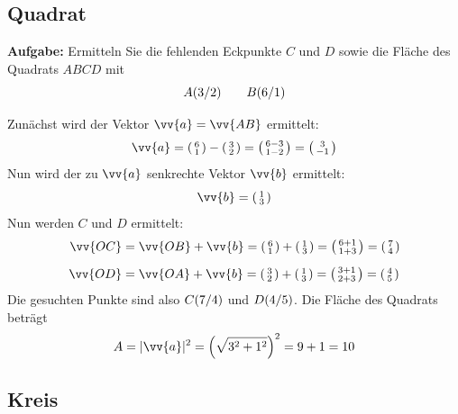 \newpage
\subsection{Quadrat}

\textbf{Aufgabe:} Ermitteln Sie die fehlenden Eckpunkte $C$ und $D$ sowie die Fläche des Quadrats $ABCD$ mit
\[
  \coord[A]{3,2} \qquad \coord[B]{6,1}
\]
\begin{center}
\end{center}
Zunächst wird der Vektor $\vv{a} = \vv{AB}$ ermittelt:
\[
  \vv{a} = \tvec{6,1}-\tvec{3,2} = \tvec{6-3,1-2} = \tvec{3,-1}
\]
Nun wird der zu $\vv{a}$ senkrechte Vektor $\vv{b}$ ermittelt:
\[
  \vv{b} = \tvec{1,3}
\]
Nun werden $C$ und $D$ ermittelt:
\begin{align*}
  \vv{OC} &= \vv{OB}+\vv{b} = \tvec{6,1} + \tvec{1,3} = \tvec{6+1,1+3} = \tvec{7,4} \\[2mm]
  \vv{OD} &= \vv{OA}+\vv{b} = \tvec{3,2} + \tvec{1,3} = \tvec{3+1,2+3} = \tvec{4,5}
\end{align*}
Die gesuchten Punkte sind also $\coord[C]{7,4}$ und $\coord[D]{4,5}$. Die Fläche
des Quadrats beträgt
\[
  A = |\vv{a}|^{2} = \left(\sqrt{3^{2}+1^{2}}\right)^{2} = 9+1 = 10
\]

\newpage
\subsection{Kreis}

